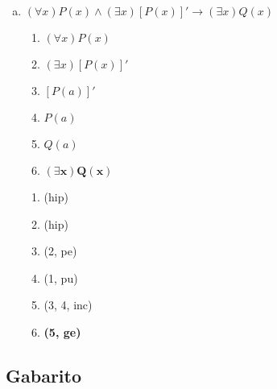 \documentclass[a4paper, 12pt, addpoints]{exam}
\begin{document}
\begin{questions}
\begin{resp}
\begin{enumerate}[a)]
\begin{multicols}{2}
              \columnbreak

              \begin{enumerate}[\ding{32}]
                \item (hip)
                \item (1, pe)
                \item (2, pe)
                \item (3, ge)
                \item \textbf{(4, ge)}
              \end{enumerate}

            \end{multicols}

      \item $(\forall x)P(x) \land (\exists x)[P(x)]' \rightarrow (\exists x)Q(x)$
            \begin{multicols}{2}

              \begin{enumerate}[1.]
                \item $(\forall x)P(x)$
                \item $(\exists x)[P(x)]'$
                \item $[P(a)]'$
                \item $P(a)$
                \item $Q(a)$
                \item $\boldsymbol{(\exists x)Q(x)}$
              \end{enumerate}

              \columnbreak

              \begin{enumerate}[\ding{32}]
                \item (hip)
                \item (hip)
                \item (2, pe)
                \item (1, pu)
                \item (3, 4, inc)
                \item \textbf{(5, ge)}
              \end{enumerate}

            \end{multicols}
    \end{enumerate}
  \end{resp}

\end{questions}

\newpage

\vspace{1cm}
\begin{center}
  \section*{Gabarito}
\end{center}
\end{document}
